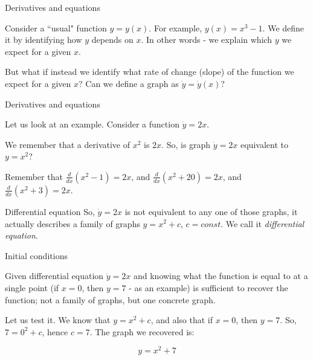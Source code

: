 \documentclass{beamer}
\begin{document}
\begin{frame}{Derivatives and equations}
	\begin{flushleft}
		
		Consider a ``usual" function $y = y(x)$. For example, $y(x) = x^3 - 1$. We define it by identifying how $y$ depends on $x$. In other words - we explain which $y$ we expect for a given $x$.
		
		\bigskip
		
		But what if instead we identify what rate of change (slope) of the function we expect for a given $x$? Can we define a graph as $\dot y =\dot y(x)$?
		
	\end{flushleft}
\end{frame}



\begin{frame}{Derivatives and equations}
	\begin{flushleft}
		
		Let us look at an example. Consider a function $\dot y =2x$.
		
		\bigskip
		
		We remember that a derivative of $x^2$ is $2x$. So, is graph $\dot y =2x$ equivalent to $y =x^2$?
		
		\bigskip
		
		Remember that $\frac{d}{dx} (x^2 - 1) = 2x$, and $\frac{d}{dx} (x^2 + 20) = 2x$, and $\frac{d}{dx} (x^2 + 3) = 2x$. 
		
		\begin{block}{Differential equation}
		So, $\dot y =2x$ is not equivalent to any one of those graphs, it actually describes a family of graphs $y =x^2 + c$, $c = const$. We call it \emph{differential equation}.
		\end{block}
		
	\end{flushleft}
\end{frame}




\begin{frame}{Initial conditions}
	\begin{flushleft}
		
		Given differential equation $\dot y =2x$ and knowing what the function is equal to at a single point (if $x = 0$, then $y = 7$ - as an example) is sufficient to recover the function; not a family of graphs, but one concrete graph.
		
		\bigskip
		
		Let us test it. We know that $y =x^2 + c$, and also that if $x = 0$, then $y = 7$. So, $7 =0^2 + c$, hence $c = 7$. The graph we recovered is:
		
		\begin{equation}
			y =x^2 + 7
		\end{equation}
		
	\end{flushleft}
\end{frame}
\end{document}
